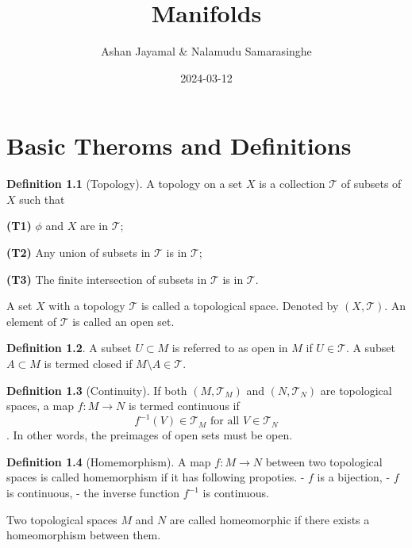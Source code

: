\documentclass[
]{book}
\title{Manifolds}
\author{Ashan Jayamal \& Nalamudu Samarasinghe}
\date{2024-03-12}
\theoremstyle{definition}
\newtheorem{definition}{Definition}[chapter]
\theoremstyle{definition}
\theoremstyle{definition}
\theoremstyle{definition}
\theoremstyle{remark}
\begin{document}
\maketitle

{
\setcounter{tocdepth}{1}
\tableofcontents
}
\hypertarget{basic-theroms-and-definitions}{%
\chapter{Basic Theroms and Definitions}\label{basic-theroms-and-definitions}}

\begin{definition}[Topology]
\protect\hypertarget{def:Top}{}\label{def:Top}A topology on a set \(X\) is a collection \(\mathcal{T}\) of subsets of \(X\) such that

\textbf{(T1)} \(\phi\) and \(X\) are in \(\mathcal{T}\);

\textbf{(T2)} Any union of subsets in \(\mathcal{T}\) is in \(\mathcal{T}\);

\textbf{(T3)} The finite intersection of subsets in \(\mathcal{T}\) is in \(\mathcal{T}\).
\end{definition}

A set \(X\) with a topology \(\mathcal{T}\) is called a topological space. Denoted by \((X,\mathcal{T})\). An element of \(\mathcal{T}\) is called an open set.

\begin{definition}
\protect\hypertarget{def:unnamed-chunk-1}{}\label{def:unnamed-chunk-1}A subset \(U \subset M\) is referred to as open in \(M\) if \(U \in \mathcal{T}\). A subset \(A \subset M\) is termed closed if \(M \setminus A \in \mathcal{T}\).
\end{definition}

\begin{definition}[Continuity]
\protect\hypertarget{def:unnamed-chunk-2}{}\label{def:unnamed-chunk-2}If both \((M, \mathcal{T}_M)\) and \((N, \mathcal{T}_N)\) are topological spaces, a map \(f : M \rightarrow N\) is termed continuous if \[f^{-1}(V) \in \mathcal{T}_M \text{ for all } V \in \mathcal{T}_N\].
In other words, the preimages of open sets must be open.
\end{definition}

\begin{definition}[Homemorphism]
\protect\hypertarget{def:unnamed-chunk-3}{}\label{def:unnamed-chunk-3}A map \(f : M \rightarrow N\) between two topological spaces is called homemorphism if it has following propoties.
- \(f\) is a bijection,
- \(f\) is continuous,
- the inverse function \(f^{-1}\) is continuous.

Two topological spaces \(M\) and \(N\) are called homeomorphic if there exists a homeomorphism between them.
\end{definition}
\end{document}
